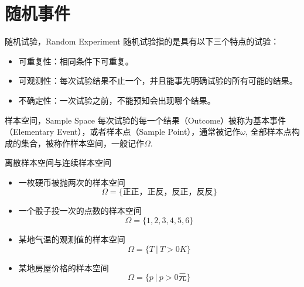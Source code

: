 
\section{随机事件}


\begin{frame}

\begin{block}{随机试验，Random Experiment}
随机试验指的是具有以下三个特点的试验：
\begin{itemize}
\item 可重复性：相同条件下可重复。
\item 可观测性：每次试验结果不止一个，并且能事先明确试验的所有可能的结果。
\item 不确定性：一次试验之前，不能预知会出现哪个结果。
\end{itemize}
\end{block}

\begin{block}{样本空间，Sample Space}
每次试验的每一个结果（Outcome）被称为基本事件（Elementary Event），或者样本点（Sample Point），通常被记作$\omega$, 全部样本点构成的集合，被称作样本空间，一般记作$\Omega$.
\end{block}

\end{frame}


\begin{frame}

\begin{block}{离散样本空间与连续样本空间}
\begin{itemize}
\item 一枚硬币被抛两次的样本空间
\[\Omega = \{\text{正正，正反，反正，反反}\}\]
\item 一个骰子投一次的点数的样本空间
\[\Omega = \{1,2,3,4,5,6\}\]
\pause
\item 某地气温的观测值的样本空间
\[\Omega = \{T \ |\ T > 0K\}\]
\item 某地房屋价格的样本空间
\[\Omega = \{p \ |\ p > 0\text{元}\}\]
\end{itemize}
\end{block}

\end{frame}


